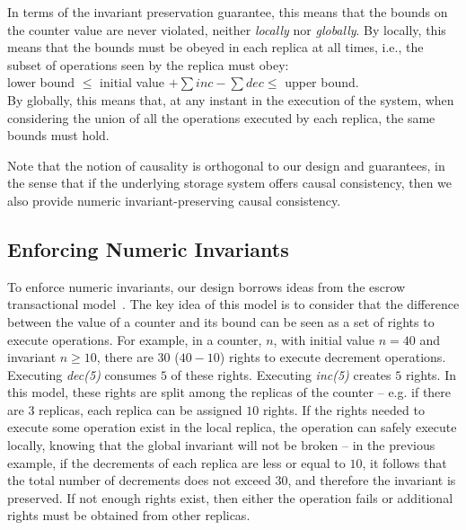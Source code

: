 \documentclass[conference]{IEEEtran}
\begin{document}
In terms of the invariant preservation guarantee, this means that the bounds on the counter
value are never violated, neither \emph{locally} nor \emph{globally}. 
By locally, this means that the bounds must
be obeyed in each replica at all times, i.e., the subset of operations seen by the replica must
obey:\\
\vspace{.2em} 
lower bound $\le$ initial value $ + \sum \textit{inc} - \sum  \textit{dec} \le$ upper bound.\\
\vspace{.2em} 
\noindent By globally, this means that, at any instant in the execution of the system, when
considering the union of all the operations executed by each replica, the same bounds must hold.



Note that the notion of causality is orthogonal to our design and guarantees, in the sense that if the underlying storage system offers causal consistency, then we  also provide numeric invariant-preserving causal consistency.


\subsection{Enforcing Numeric Invariants}\label{sec:model:overview}

To enforce numeric invariants, our design borrows ideas from 
the escrow transactional model~\cite{escrow}. 
The key idea of this model is to consider that the difference between the 
value of a counter and its bound can be seen as a set of rights to execute operations. 
For example, in a counter, $n$, with initial value $n = 40$ and invariant $n \geq 10$, 
there are $30$ ($40 - 10$) rights to execute decrement operations. 
Executing \emph{dec(5)} consumes $5$ of these rights. 
Executing \emph{inc(5)} creates $5$ rights.
In this model, these rights are split among the replicas of the 
counter -- e.g. if there are $3$ replicas, each replica can be assigned $10$ rights.
If the rights needed to execute some operation exist in the local replica, 
the operation can safely execute locally, knowing that the global 
invariant will not be broken -- in the previous example, 
if the decrements of each replica are less or equal to $10$, it follows that the total 
number of decrements does not exceed $30$, and therefore the invariant is preserved.
If not enough rights exist, then either the operation fails or additional rights 
must be obtained from other replicas.
\end{document}
